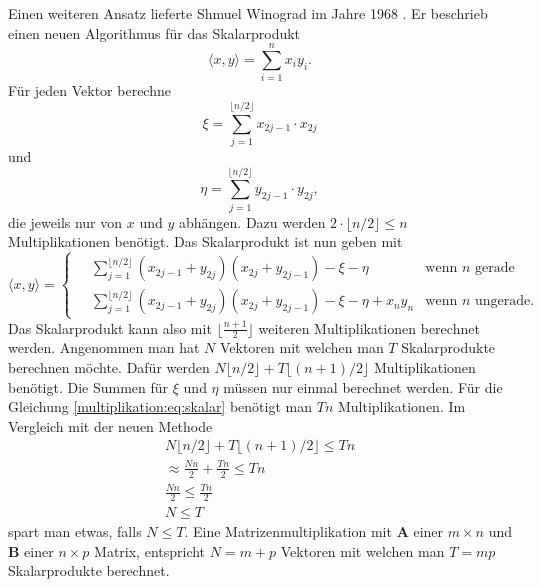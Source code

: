 Einen weiteren Ansatz lieferte Shmuel Winograd im Jahre 1968 \cite{multiplikation:winograd_1968}.
Er beschrieb einen neuen Algorithmus f\"ur das Skalarprodukt
\begin{equation} \label{multiplikation:eq:skalar}
	\langle x,y \rangle = \sum_{i=1}^{n}x_i y_i.
\end{equation}
F\"ur jeden Vektor berechne
\begin{equation}
	\xi = \sum_{j=1}^{ \lfloor n/2 \rfloor} x_{2j-1} \cdot x_{2j}
\end{equation}
und
\begin{equation}
	\eta = \sum_{j=1}^{ \lfloor n/2 \rfloor} y_{2j-1} \cdot y_{2j},
\end{equation}
die jeweils nur von $x$ und $y$ abhängen.
Dazu werden $2 \cdot  \lfloor n/2 \rfloor \leq n$ Multiplikationen benötigt.
Das Skalarprodukt ist nun geben mit
\begin{equation}
	\langle x,y \rangle =
	\begin{cases}
	 \displaystyle \quad \sum_{j=1}^{ \lfloor n/2 \rfloor} (x_{2j-1} + y_{2j})(x_{2j}+y_{2j-1})-\xi - \eta & \text{wenn  $n$ gerade}\\
	\displaystyle  \quad \sum_{j=1}^{ \lfloor n/2 \rfloor} (x_{2j-1} + y_{2j})(x_{2j}+y_{2j-1})-\xi - \eta + x_n y_n & \text{wenn  $n$ ungerade}.
	\end{cases}
\end{equation}
Das Skalarprodukt kann also mit $ \lfloor \frac{n+1}{2} \rfloor$ weiteren Multiplikationen berechnet werden.
Angenommen man hat $N$ Vektoren mit welchen man $T$ Skalarprodukte berechnen m\"ochte.
Daf\"ur werden $N\lfloor n/2 \rfloor + T\lfloor (n+1)/2 \rfloor $ Multiplikationen ben\"otigt.
Die Summen f\"ur $\xi$ und $\eta$ m\"ussen nur einmal berechnet werden.
Für die Gleichung \eqref{multiplikation:eq:skalar} benötigt man $Tn$ Multiplikationen.
Im Vergleich mit der neuen Methode
\begin{equation}
	\begin{split}\label{multiplikation:eq:eff}
		N\lfloor n/2 \rfloor + T\lfloor (n+1)/2 \rfloor \leq Tn \\
		\approx \frac{Nn}{2} + \frac{Tn}{2} \leq Tn \\
		\frac{Nn}{2} \leq \frac{Tn}{2} \\
		N \leq T
\end{split}
\end{equation}
spart man etwas, falls $N\leq T$.
Eine Matrizenmultiplikation mit $\mathbf{A}$ einer $m \times n$ und $\mathbf{B}$ einer $n \times p$ Matrix, entspricht $N=m+p$ Vektoren mit welchen man $T=mp$ Skalarprodukte berechnet.
